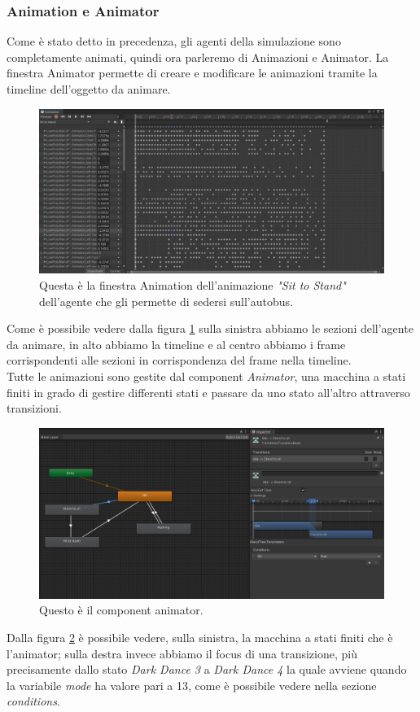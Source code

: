 \documentclass[12pt, openany]{book}
\begin{document}
	\subsubsection{Animation e Animator}
		Come è stato detto in precedenza, gli agenti della simulazione sono completamente animati, quindi ora parleremo di Animazioni e Animator. La finestra Animator permette di creare e modificare le animazioni tramite la timeline dell'oggetto da animare. 
		\begin{figure}[H]
			\centering
			\includegraphics[width=0.8\linewidth]{"Immagini/Animation"}
			\caption{Questa è la finestra Animation dell'animazione \emph{"Sit to Stand"} dell'agente che gli permette di sedersi sull'autobus.}
			\label{fig:Animation}
		\end{figure}
		Come è possibile vedere dalla figura \ref{fig:Animation} sulla sinistra abbiamo le sezioni dell'agente da animare, in alto abbiamo la timeline e al centro abbiamo i frame corrispondenti alle sezioni in corrispondenza del frame nella timeline.\\
		Tutte le animazioni sono gestite dal component \emph{Animator}, una macchina a stati finiti in grado di gestire differenti stati e passare da uno stato all'altro attraverso transizioni. 
		\begin{figure}[H]
			\centering
			\includegraphics[width=0.8\linewidth]{"Immagini/Animator"}
			\caption{Questo è il component animator.}
			\label{fig:Animator}
		\end{figure}
		Dalla figura \ref{fig:Animator} è possibile vedere, sulla sinistra, la macchina a stati finiti che è l'animator; sulla destra invece abbiamo il focus di una transizione, più precisamente dallo stato  \emph{Dark Dance 3} a \emph{Dark Dance 4} la quale avviene quando la variabile \emph{mode} ha valore pari a 13, come è possibile vedere nella sezione \emph{conditions}.
\end{document}
